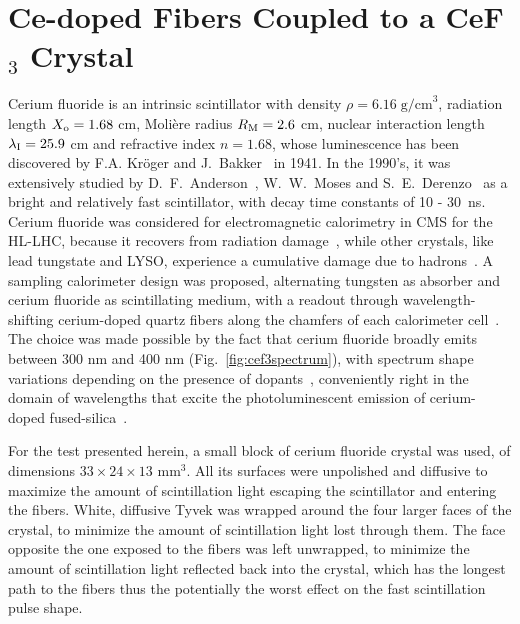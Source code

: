\documentclass[a4paper,11pt]{article}
\begin{document}
\section{Ce-doped Fibers Coupled to a CeF\texorpdfstring{$_3$}{} Crystal}
\label{sec:WLS}
Cerium fluoride is an intrinsic scintillator with density $\rho=6.16\; {\mathrm{g/cm}}^3$, radiation length $X_{\rm o} = 1.68$ cm, Moli\`ere radius $R_{\rm M} = 2.6$ cm, nuclear interaction length $\lambda_{\rm I} = 25.9$ cm and refractive index $n = 1.68$, whose luminescence has been discovered by F.A. Kr\"oger and J.~Bakker~\cite{r-KRO} in 1941. In the 1990's, it was extensively studied by D.~F.~Anderson~\cite{r-AND}, W.~W.~Moses and S.~E.~Derenzo~\cite{r-MOS} as a bright and relatively fast scintillator, with decay time constants of 10 - 30~ns. 
Cerium fluoride was considered for electromagnetic calorimetry in CMS for the HL-LHC, because it recovers from radiation damage~\cite{r-NIMCEF3}, while other crystals, like lead tungstate and LYSO, experience a cumulative damage due to hadrons~\cite{r-FISSNIM, r-NIMLYSO}. A sampling calorimeter design was proposed, alternating tungsten as absorber and cerium fluoride as scintillating medium, with a readout through wavelength-shifting cerium-doped quartz fibers along the chamfers of each calorimeter cell~\cite{r-CALORCEF3, r-WCEF3FRA, r-WCEF3H4}. The choice was made possible by the fact that cerium fluoride broadly emits between 300 nm and 400 nm (Fig.~\ref{fig:cef3spectrum}), with spectrum shape variations depending on the presence of dopants~\cite{r-EACEF3}, conveniently right in the domain of wavelengths that excite the photoluminescent emission of cerium-doped fused-silica~\cite{r-TTU,r-vedda}.

For the test presented herein, a small block of cerium fluoride crystal was used, of dimensions $33\times 24 \times13$ mm$^3$. All its surfaces were unpolished and diffusive to maximize the amount of scintillation light escaping the scintillator and entering the fibers. White, diffusive Tyvek was wrapped around the four larger faces of the crystal, to minimize the amount of scintillation light lost through them. The face opposite the one exposed to the fibers was left unwrapped, to minimize the amount of scintillation light reflected back into the crystal, which has the longest path to the fibers thus the potentially the worst effect on the fast scintillation pulse shape.
\end{document}
